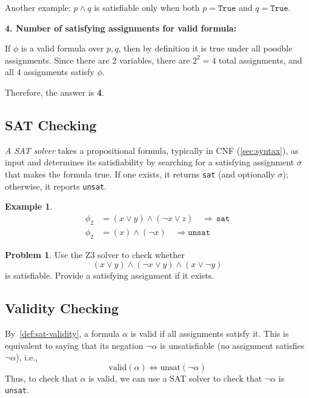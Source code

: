 \documentclass[oneside,11pt,dvipsnames]{book}
\numberwithin{equation}{section}
\theoremstyle{definition}
\newtheorem{example}{Example}[section]
\newtheorem{problem}{Problem}[section]
\theoremstyle{remark}
\newenvironment{solution}{%
  \ifbool{showsol}{%
    \begin{mysolbox}%
        {\small \textbf{Solution}: }
  }{%
    \comment %
  }%
}{%
  \ifbool{showsol}{%
    \end{mysolbox}%
  }{%
    \endcomment %
  }%
}
\newcommand{\sat}{\texttt{sat}}
\newcommand{\unsat}{\texttt{unsat}}
\begin{document}
\begin{solution}
\noindent Another example: $p \land q$ is satisfiable only when both $p = \texttt{True}$ and $q = \texttt{True}$.

\vspace{0.5\baselineskip}

\noindent\textbf{4. Number of satisfying assignments for valid formula:}

\noindent If $\phi$ is a valid formula over $p, q$, then by definition it is true under all possible assignments. Since there are $2$ variables, there are $2^2 = 4$ total assignments, and all $4$ assignments satisfy $\phi$.

\noindent Therefore, the answer is \textbf{4}.

\end{solution}
\subsection{SAT Checking}\label{sec:sat-solving}

\emph{A SAT solver} takes a propositional formula, typically in CNF (\autoref{sec:syntax}), as input and determines its satisfiability by searching for a satisfying assignment $\sigma$ that makes the formula true. If one exists, it returns \sat{} (and optionally $\sigma$); otherwise, it reports \unsat{}.

\begin{example}
\begin{align*}
\phi_2 &= (x \lor y) \land (\lnot x \lor z) \quad \Rightarrow \, \sat{}\\
\phi_2 &= (x) \land (\lnot x) \quad \Rightarrow \unsat{}
\end{align*}
\end{example}




\begin{problem}
Use the Z3 solver to check whether
\[
(x \lor y) \land (\lnot x \lor y) \land (x \lor \lnot y)
\] is satisfiable.
Provide a satisfying assignment if it exists.
\end{problem}




\subsection{Validity Checking}\label{sec:validity-checking}
By~\autoref{def:sat-validity}, a formula $\alpha$ is valid if all assignments satisfy it.
This is equivalent to saying that its negation $\lnot{\alpha}$ is unsatisfiable (no assignment satisfies $\lnot{\alpha}$), i.e.,
\[
\text{valid}(\alpha) \iff \text{unsat}(\lnot{\alpha})
\]
Thus, to check that $\alpha$ is valid, we can use a SAT solver to check that $\lnot{\alpha}$ is \unsat{}.
\end{document}
